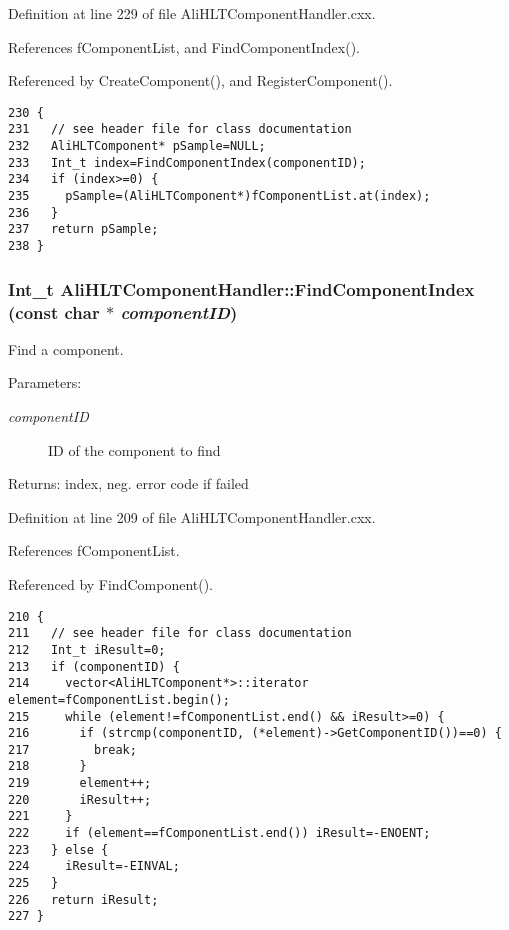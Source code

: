 Definition at line 229 of file Ali\-HLTComponent\-Handler.cxx.

References f\-Component\-List, and Find\-Component\-Index().

Referenced by Create\-Component(), and Register\-Component().

\footnotesize\begin{verbatim}230 {
231   // see header file for class documentation
232   AliHLTComponent* pSample=NULL;
233   Int_t index=FindComponentIndex(componentID);
234   if (index>=0) {
235     pSample=(AliHLTComponent*)fComponentList.at(index);
236   }
237   return pSample;
238 }
\end{verbatim}\normalsize 


\subsubsection{\setlength{\rightskip}{0pt plus 5cm}Int\_\-t Ali\-HLTComponent\-Handler::Find\-Component\-Index (const char $\ast$ {\em component\-ID})\hspace{0.3cm}{\tt  [private]}}\label{classAliHLTComponentHandler_d0}


Find a component. \begin{Desc}
\item[Parameters:]
\begin{description}
\item[{\em component\-ID}]ID of the component to find \end{description}
\end{Desc}
\begin{Desc}
\item[Returns:]index, neg. error code if failed \end{Desc}


Definition at line 209 of file Ali\-HLTComponent\-Handler.cxx.

References f\-Component\-List.

Referenced by Find\-Component().

\footnotesize\begin{verbatim}210 {
211   // see header file for class documentation
212   Int_t iResult=0;
213   if (componentID) {
214     vector<AliHLTComponent*>::iterator element=fComponentList.begin();
215     while (element!=fComponentList.end() && iResult>=0) {
216       if (strcmp(componentID, (*element)->GetComponentID())==0) {
217         break;
218       }
219       element++;
220       iResult++;
221     }
222     if (element==fComponentList.end()) iResult=-ENOENT;
223   } else {
224     iResult=-EINVAL;
225   }
226   return iResult;
227 }
\end{verbatim}\normalsize 



